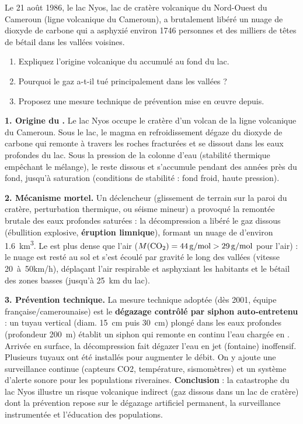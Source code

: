 \documentclass[11pt]{article}
\begin{document}
\begin{exoresolu}
Le 21 août 1986, le lac Nyos, lac de cratère volcanique du Nord-Ouest du Cameroun (ligne volcanique du Cameroun), a brutalement libéré un nuage de dioxyde de carbone qui a asphyxié environ \num{1746} personnes et des milliers de têtes de bétail dans les vallées voisines.
\begin{enumerate}
\item Expliquez l'origine volcanique du  accumulé au fond du lac.
\item Pourquoi le gaz a-t-il tué principalement dans les vallées ?
\item Proposez une mesure technique de prévention mise en œuvre depuis.
\end{enumerate}
\tcblower
\textbf{1. Origine du .} Le lac Nyos occupe le cratère d'un volcan de la ligne volcanique du Cameroun. Sous le lac, le magma en refroidissement dégaze du dioxyde de carbone qui remonte à travers les roches fracturées et se dissout dans les eaux profondes du lac. Sous la pression de la colonne d'eau (stabilité thermique empêchant le mélange), le  reste dissous et s'accumule pendant des années près du fond, jusqu'à saturation (conditions de stabilité : fond froid, haute pression).

\textbf{2. Mécanisme mortel.} Un déclencheur (glissement de terrain sur la paroi du cratère, perturbation thermique, ou séisme mineur) a provoqué la remontée brutale des eaux profondes saturées : la décompression a libéré le gaz dissous (ébullition explosive, \textbf{éruption limnique}), formant un nuage de  d'environ \SI{1.6}{km^3}. Le  est plus dense que l'air ($M(\ce{CO2}) = \SI{44}{g/mol} > \SI{29}{g/mol}$ pour l'air) : le nuage est resté au sol et s'est écoulé par gravité le long des vallées (vitesse \SI{20}{à 50}{km/h}), déplaçant l'air respirable et asphyxiant les habitants et le bétail des zones basses (jusqu'à \SI{25}{km} du lac).

\textbf{3. Prévention technique.} La mesure technique adoptée (dès 2001, équipe française/camerounaise) est le \textbf{dégazage contrôlé par siphon auto-entretenu} : un tuyau vertical (diam. \SI{15}{cm} puis \SI{30}{cm}) plongé dans les eaux profondes (profondeur \SI{200}{m}) établit un siphon qui remonte en continu l'eau chargée en . Arrivée en surface, la décompression fait dégazer l'eau en jet (fontaine) inoffensif. Plusieurs tuyaux ont été installés pour augmenter le débit. On y ajoute une surveillance continue (capteurs CO2, température, sismomètres) et un système d'alerte sonore pour les populations riveraines.
\textbf{Conclusion} : la catastrophe du lac Nyos illustre un risque volcanique indirect (gaz dissous dans un lac de cratère) dont la prévention repose sur le dégazage artificiel permanent, la surveillance instrumentée et l'éducation des populations.
\end{exoresolu}
\end{document}
